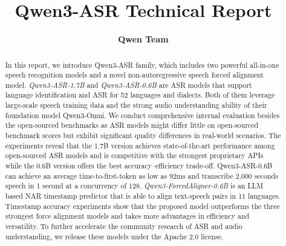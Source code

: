 \documentclass{article} %
\title{Qwen3-ASR Technical Report}
\author{
\bf Qwen Team
}
\begin{document}
\maketitle


\begin{abstract}

In this report, we introduce Qwen3-ASR family, which includes two powerful all-in-one speech recognition models and a novel non-autoregressive speech forced alignment model. \textit{Qwen3-ASR-1.7B} and \textit{Qwen3-ASR-0.6B} are ASR models that support language identification and ASR for 52 languages and dialects. Both of them leverage large-scale speech training data and the strong audio understanding ability of their foundation model Qwen3-Omni. We conduct comprehensive internal evaluation besides the open-sourced benchmarks as ASR models might differ little on open-sourced benchmark scores but exhibit significant quality differences in real-world scenarios. The experiments reveal that the 1.7B version achieves state-of-the-art performance among open-sourced ASR models and is competitive with the strongest proprietary APIs while the 0.6B version offers the best accuracy–efficiency trade-off. Qwen3-ASR-0.6B can achieve an average time-to-first-token as low as 92ms and transcribe 2,000 seconds speech in 1 second at a concurrency of 128. \textit{Qwen3-ForcedAligner-0.6B} is an LLM based NAR timestamp predictor that is able to align text-speech pairs in 11 languages. Timestamp accuracy experiments show that the proposed model outperforms the three strongest force alignment models and takes more advantages in efficiency and versatility. To further accelerate the community research of ASR and audio understanding, we release these models under the Apache 2.0 license.

\end{abstract}




%









\end{document}
